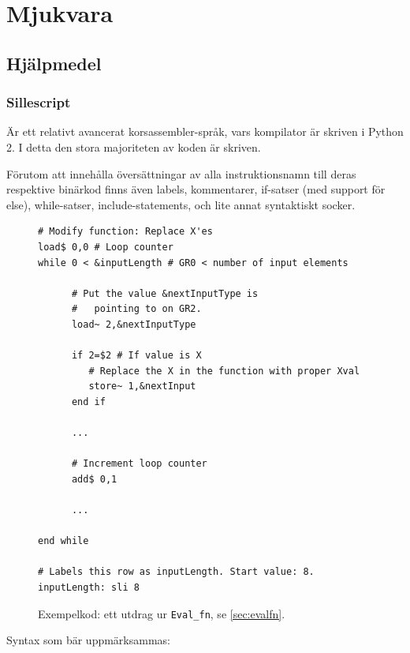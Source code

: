 \documentclass[]{article}
\begin{document}
\section{Mjukvara}

\subsection{Hjälpmedel}

\subsubsection{Sillescript}

Är ett relativt avancerat korsassembler-språk, vars kompilator är skriven i Python 2. I detta den stora majoriteten av koden är skriven.

Förutom att innehålla översättningar av alla instruktionsnamn till deras respektive binärkod finns även labels, kommentarer, if-satser (med support för else), while-satser, include-statements, och lite annat syntaktiskt socker.

\begin{figure}[h]
\centering
\begin{oframed}
\begin{verbatim}
# Modify function: Replace X'es
load$ 0,0 # Loop counter
while 0 < &inputLength # GR0 < number of input elements
      
      # Put the value &nextInputType is 
      #   pointing to on GR2.
      load~ 2,&nextInputType

      if 2=$2 # If value is X
      	 # Replace the X in the function with proper Xval
      	 store~ 1,&nextInput
      end if

      ...

      # Increment loop counter
      add$ 0,1

      ...

end while

# Labels this row as inputLength. Start value: 8.
inputLength: sli 8
\end{verbatim}
\end{oframed}
\caption{Exempelkod: ett utdrag ur \texttt{Eval\_fn}, se \ref{sec:evalfn}.}
\end{figure}

\newpage

\noindent
Syntax som bär uppmärksammas:\\
\end{document}
